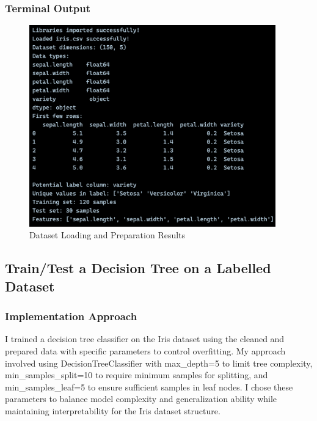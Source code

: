 \documentclass[12pt,a4paper]{article}
\begin{document}
\subsubsection{Terminal Output}
\begin{figure}[h!]
\centering
    \includegraphics[width=0.95\textwidth]{Figures/loading.png}
    \caption{Dataset Loading and Preparation Results}
\end{figure}

\newpage 

\subsection{Train/Test a Decision Tree on a Labelled Dataset}

\subsubsection{Implementation Approach}
I trained a decision tree classifier on the Iris dataset using the cleaned and prepared data with specific parameters to control overfitting. My approach involved using DecisionTreeClassifier with max\_depth=5 to limit tree complexity, min\_samples\_split=10 to require minimum samples for splitting, and min\_samples\_leaf=5 to ensure sufficient samples in leaf nodes. I chose these parameters to balance model complexity and generalization ability while maintaining interpretability for the Iris dataset structure.
\end{document}
